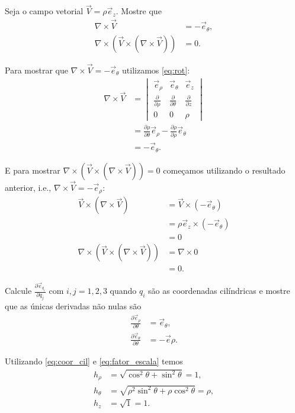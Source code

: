 \documentclass[a4paper,12pt, leqno, answers]{exam}
\newcommand{\devp}[2]{\frac{\partial #1}{\partial #2}}
\begin{document}
\begin{questions}
    \question Seja o campo vetorial $\vec{V} = \rho \vec{e}_z$. Mostre que
    \begin{align*}
        \nabla \times \vec{V} &= -\vec{e}_\theta, \\
        \nabla \times (\vec{V} \times (\nabla \times \vec{V})) &= 0.
    \end{align*}
    \begin{solution}
        Para mostrar que $\nabla \times \vec{V} = - \vec{e}_\theta$ utilizamos \eqref{eq:rot}:
        \begin{align*}
            \nabla \times \vec{V} &= \begin{vmatrix}
                  \vec{e}_\rho & \vec{e}_\theta & \vec{e}_z \\
                  \devp{}{\rho} & \devp{}{\theta} & \devp{}{z} \\
                  0 & 0 & \rho
            \end{vmatrix} \\
            &= \devp{\rho}{\theta} \vec{e}_\rho - \devp{\rho}{\rho} \vec{e}_\theta \\
            &= - \vec{e}_\theta.
        \end{align*}
  
        E para mostrar $\nabla \times \left(\vec{V} \times \left(\nabla \times \vec{V}\right)\right) = 0$ come\c{c}amos utilizando o resultado anterior, i.e., $\nabla \times \vec{V} = - \vec{e}_\rho$:
        \begin{align*}
            \vec{V} \times \left(\nabla \times \vec{V}\right) &= \vec{V} \times \left(- \vec{e}_\theta\right) \\
            &= \rho \vec{e}_z \times \left(- \vec{e}_\theta\right) \\
            &= 0 \\
            \nabla \times \left(\vec{V} \times \left(\nabla \times \vec{V}\right)\right) &= \nabla \times 0 \\
            &= 0.
        \end{align*}
    \end{solution}
  
    \question Calcule $\devp{\vec{e}_{q_i}}{q_j}$ com $i,j = 1, 2, 3$ quando $q_i$ s\~{a}o as coordenadas cil\'{i}ndricas e mostre que as únicas derivadas n\~{a}o nulas s\~{a}o
    \begin{align*}
        \devp{\vec{e}_\rho}{\theta} &= \vec{e}_\theta, \\
        \devp{\vec{e}_\theta}{\theta} &= - \vec{e}\rho.
    \end{align*}
    \begin{solution}
        Utilizando \eqref{eq:coor_cil} e \eqref{eq:fator_escala} temos
        \begin{align*}
            h_\rho &= \sqrt{\cos^2 \theta + \sin^2 \theta} = 1, \\
            h_\theta &= \sqrt{\rho^2 \sin^2 \theta + \rho \cos^2 \theta} = \rho, \\
            h_z &= \sqrt{1} = 1.
        \end{align*}
  

\end{solution}
\end{questions}
\end{document}
